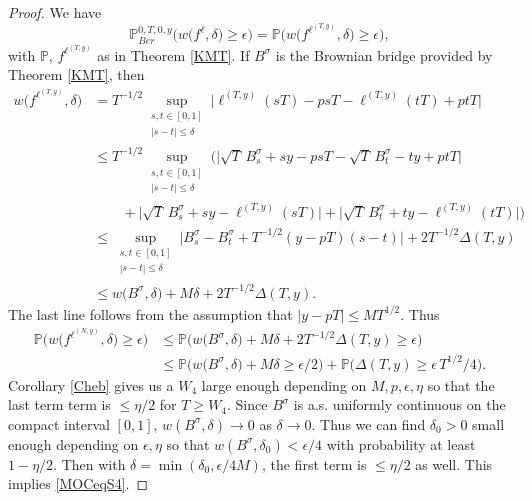 \begin{proof}
	We have
	\[
	\mathbb{P}^{0,T,0,y}_{Ber}\Big( w\big({f^\ell},\delta\big) \geq \epsilon \Big) = \mathbb{P}\Big( w\big(f^{\ell^{(T,y)}},\delta\big) \geq \epsilon \Big),
	\]
	with $\mathbb{P}$, $f^{\ell^{(T,y)}}$ as in Theorem \ref{KMT}. If $B^\sigma$ is the Brownian bridge provided by Theorem \ref{KMT}, then
	\begin{align*}
	w\big(f^{\ell^{(T,y)}},\delta\big) &= T^{-1/2} \sup_{\substack{s,t \in [0,1]\\ |s-t| \leq \delta}} \Big| \ell^{(T,y)}(sT) - psT - \ell^{(T,y)}(tT) + ptT \Big|\\
	&\leq T^{-1/2} \sup_{\substack{s,t \in [0,1]\\ |s-t| \leq \delta}} \Big(\big| \sqrt{T}\,B^\sigma_s + sy - psT - \sqrt{T}\,B^\sigma_t - ty + ptT \big|\\
	&\qquad + \big|\sqrt{T}\,B^\sigma_s + sy - \ell^{(T,y)}(sT)\big| + \big|\sqrt{T}\,B^\sigma_t + ty - \ell^{(T,y)}(tT)\big|\Big)\\
	&\leq \sup_{\substack{s,t \in [0,1]\\ |s-t| \leq \delta}} \Big| B^\sigma_s - B^\sigma_t + T^{-1/2} (y-pT)(s-t)\Big| + 2T^{-1/2}\Delta(T,y)\\
	&\leq w\big(B^\sigma,\delta\big) + M\delta + 2T^{-1/2}\Delta(T,y).
	\end{align*}
	The last line follows from the assumption that $|y-pT|\leq MT^{1/2}$. Thus
	\begin{align*}
	\mathbb{P}\Big( w\big(f^{\ell^{(N,y)}},\delta\big) \geq \epsilon \Big) &\leq \mathbb{P}\Big( w\big(B^\sigma,\delta\big) + M\delta + 2T^{-1/2}\Delta(T,y) \geq \epsilon \Big)\\
	&\leq \mathbb{P}\Big( w\big(B^\sigma,\delta\big) + M\delta \geq \epsilon/2 \Big) + \mathbb{P}\Big( \Delta(T,y) \geq \epsilon\, T^{1/2}/4 \Big).
	\end{align*}
	Corollary \ref{Cheb} gives us a $W_4$ large enough depending on $M,p,\epsilon,\eta$ so that the last term term is $\leq\eta/2$ for $T\geq W_4$. Since $B^\sigma$ is a.s. uniformly continuous on the compact interval $[0,1]$, $w(B^\sigma,\delta) \to 0$ as $\delta\to 0$. Thus we can find $\delta_0>0$ small enough depending on $\epsilon,\eta$ so that $w(B^\sigma,\delta_0) < \epsilon/4$ with probability at least $1-\eta/2$. Then with $\delta = \min(\delta_0, \epsilon/4M)$, the first term is $\leq\eta/2$ as well. This implies \eqref{MOCeqS4}.
\end{proof}

